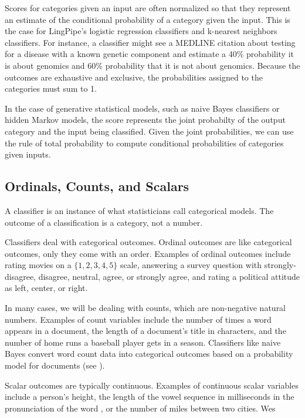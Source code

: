 Scores for categories given an input are often normalized so that they
represent an estimate of the conditional probability of a category
given the input.  This is the case for LingPipe's logistic regression
classifiers and k-nearest neighbors classifiers.  For instance, a
classifier might see a MEDLINE citation about testing for a disease
with a known genetic component and estimate a 40\% probability it is
about genomics and 60\% probability that it is not about genomics.
Because the outcomes are exhaustive and exclusive, the probabilities
assigned to the categories must sum to 1.

In the case of generative statistical models, such as naive Bayes
classifiers or hidden Markov models, the score represents the joint
probabilty of the output category and the input being classified.
Given the joint probabilities, we can use the rule of total
probability to compute conditional probabilities of categories given
inputs.

\subsection{Ordinals, Counts, and Scalars}

A classifier is an instance of what statisticians call categorical
models.  The outcome of a classification is a category, not a number.

Classifiers deal with categorical outcomes.  Ordinal outcomes are like
categorical outcomes, only they come with an order.  Examples of
ordinal outcomes include rating movies on a $\{ 1, 2, 3, 4, 5 \}$
scale, answering a survey question with strongly-disagree, disagree,
neutral, agree, or strongly agree, and rating a political attitude as
left, center, or right.

In many cases, we will be dealing with counts, which are non-negative
natural numbers.  Examples of count variables include the number of
times a word appears in a document, the length of a document's title
in characters, and the number of home runs a baseball player gets in a
season.  Classifiers like naive Bayes convert word count data into
categorical outcomes based on a probability model for documents (see
).

Scalar outcomes are typically continuous.  Examples of continuous
scalar variables include a person's height, the length of the vowel
sequence in milliseconds in the pronunciation of the word
, or the number of miles between two cities.  Wes

